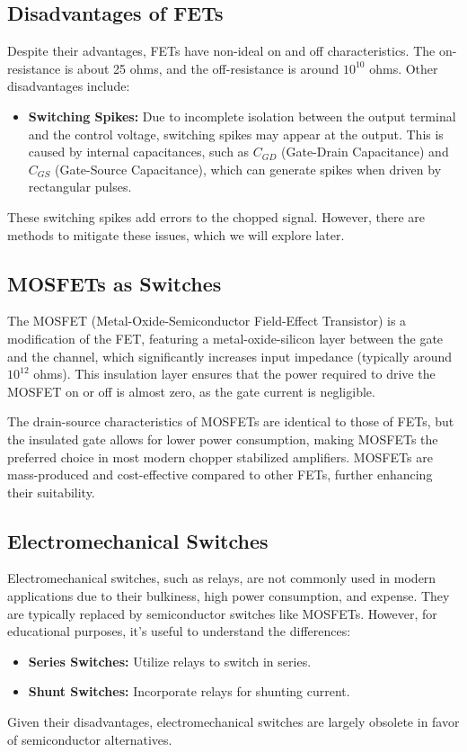 \subsection{Disadvantages of FETs}
Despite their advantages, FETs have non-ideal on and off characteristics. The on-resistance is about 25 ohms, and the off-resistance is around $10^{10}$ ohms. Other disadvantages include:
\begin{itemize}
    \item \textbf{Switching Spikes:} Due to incomplete isolation between the output terminal and the control voltage, switching spikes may appear at the output. This is caused by internal capacitances, such as $C_{GD}$ (Gate-Drain Capacitance) and $C_{GS}$ (Gate-Source Capacitance), which can generate spikes when driven by rectangular pulses.
\end{itemize}
These switching spikes add errors to the chopped signal. However, there are methods to mitigate these issues, which we will explore later.

\subsection{MOSFETs as Switches}
The MOSFET (Metal-Oxide-Semiconductor Field-Effect Transistor) is a modification of the FET, featuring a metal-oxide-silicon layer between the gate and the channel, which significantly increases input impedance (typically around $10^{12}$ ohms). This insulation layer ensures that the power required to drive the MOSFET on or off is almost zero, as the gate current is negligible.

The drain-source characteristics of MOSFETs are identical to those of FETs, but the insulated gate allows for lower power consumption, making MOSFETs the preferred choice in most modern chopper stabilized amplifiers. MOSFETs are mass-produced and cost-effective compared to other FETs, further enhancing their suitability.

\subsection{Electromechanical Switches}
Electromechanical switches, such as relays, are not commonly used in modern applications due to their bulkiness, high power consumption, and expense. They are typically replaced by semiconductor switches like MOSFETs. However, for educational purposes, it's useful to understand the differences:
\begin{itemize}
    \item \textbf{Series Switches:} Utilize relays to switch in series.
    \item \textbf{Shunt Switches:} Incorporate relays for shunting current.
\end{itemize}
Given their disadvantages, electromechanical switches are largely obsolete in favor of semiconductor alternatives.

